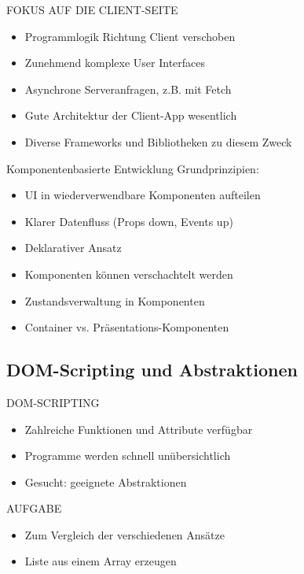 \begin{definition}{FOKUS AUF DIE CLIENT-SEITE}
\begin{itemize}
  \item Programmlogik Richtung Client verschoben
  \item Zunehmend komplexe User Interfaces
  \item Asynchrone Serveranfragen, z.B. mit Fetch
  \item Gute Architektur der Client-App wesentlich
  \item Diverse Frameworks und Bibliotheken zu diesem Zweck
\end{itemize}
\end{definition}

\begin{concept}{Komponentenbasierte Entwicklung}
    Grundprinzipien:
    \begin{itemize}
        \item UI in wiederverwendbare Komponenten aufteilen
        \item Klarer Datenfluss (Props down, Events up)
        \item Deklarativer Ansatz
        \item Komponenten können verschachtelt werden
        \item Zustandsverwaltung in Komponenten
        \item Container vs. Präsentations-Komponenten
    \end{itemize}
\end{concept}

\pagebreak

\subsection{DOM-Scripting und Abstraktionen}

\begin{definition}{DOM-SCRIPTING}
\begin{itemize}
  \item Zahlreiche Funktionen und Attribute verfügbar
  \item Programme werden schnell unübersichtlich
  \item Gesucht: geeignete Abstraktionen
\end{itemize}
\end{definition}

\begin{definition}{AUFGABE}
\begin{itemize}
  \item Zum Vergleich der verschiedenen Ansätze
  \item Liste aus einem Array erzeugen
\end{itemize}
\end{definition}

